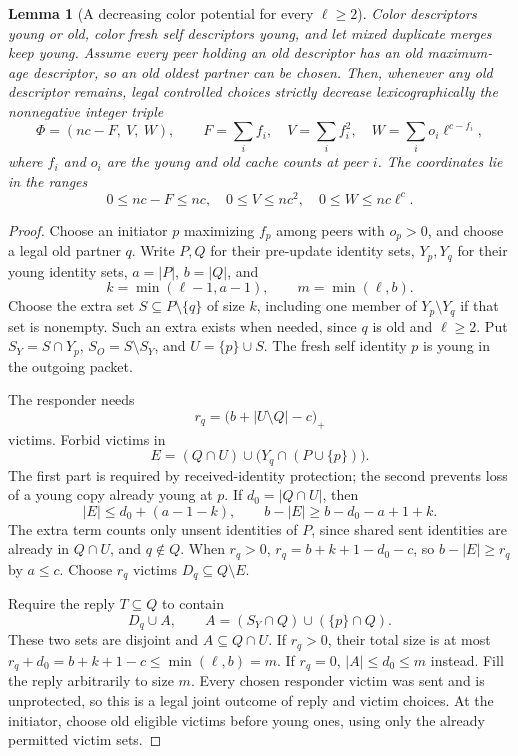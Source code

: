 \documentclass[11pt]{article}
\newtheorem{lemma}[theorem]{Lemma}
\begin{document}
\begin{lemma}[A decreasing color potential for every $\ell\ge2$]
\label{lem:generalcolor}
Color descriptors young or old, color fresh self descriptors
young, and let mixed duplicate merges keep young. Assume every
peer holding an old descriptor has an old maximum-age descriptor,
so an old oldest partner can be chosen. Then, whenever any old
descriptor remains, legal controlled choices strictly decrease
lexicographically the nonnegative integer triple
\[
 \Phi=\left(nc-F,\ V,\ W\right),\qquad
 F=\sum_i f_i,\quad V=\sum_i f_i^2,\quad
 W=\sum_i o_i\ell^{c-f_i},
\]
where $f_i$ and $o_i$ are the young and old cache counts at
peer $i$. The coordinates lie in the ranges
\[
 0\le nc-F\le nc,\quad 0\le V\le nc^2,\quad
 0\le W\le nc\ell^c.
\]
\end{lemma}
\begin{proof}
Choose an initiator $p$ maximizing $f_p$ among peers with
$o_p>0$, and choose a legal old partner $q$.
Write $P,Q$ for their pre-update identity sets, $Y_p,Y_q$
for their young identity sets, $a=|P|$, $b=|Q|$, and
\[
 k=\min(\ell-1,a-1),\qquad m=\min(\ell,b).
\]
Choose the extra set $S\subseteq P\setminus\{q\}$ of size
$k$, including one member of $Y_p\setminus Y_q$ if that set
is nonempty. Such an extra exists when needed, since $q$
is old and $\ell\ge2$. Put $S_Y=S\cap Y_p$,
$S_O=S\setminus S_Y$, and $U=\{p\}\cup S$.
The fresh self identity $p$ is young in the outgoing packet.

The responder needs
\[
 r_q=\bigl(b+|U\setminus Q|-c\bigr)_+
\]
victims. Forbid victims in
\[
 E=(Q\cap U)\cup\bigl(Y_q\cap(P\cup\{p\})\bigr).
\]
The first part is required by received-identity protection;
the second prevents loss of a young copy already young at $p$.
If $d_0=|Q\cap U|$, then
\[
 |E|\le d_0+(a-1-k),\qquad
 b-|E|\ge b-d_0-a+1+k.
\]
The extra term counts only unsent identities of $P$, since
shared sent identities are already in $Q\cap U$, and
$q\notin Q$. When $r_q>0$,
$r_q=b+k+1-d_0-c$, so $b-|E|\ge r_q$ by $a\le c$.
Choose $r_q$ victims $D_q\subseteq Q\setminus E$.

Require the reply $T\subseteq Q$ to contain
\[
 D_q\cup A,\qquad
 A=(S_Y\cap Q)\cup(\{p\}\cap Q).
\]
These two sets are disjoint and $A\subseteq Q\cap U$.
If $r_q>0$, their total size is at most
$r_q+d_0=b+k+1-c\le\min(\ell,b)=m$.
If $r_q=0$, $|A|\le d_0\le m$ instead.
Fill the reply arbitrarily to size $m$.
Every chosen responder victim was sent and is unprotected,
so this is a legal joint outcome of reply and victim choices.
At the initiator, choose old eligible victims before young
ones, using only the already permitted victim sets.


\end{proof}
\end{document}
